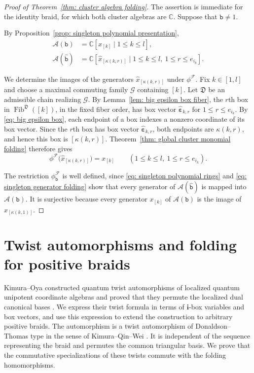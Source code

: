 \documentclass[12pt, leqno]{amsart}
\numberwithin{equation}{section}
\theoremstyle{plain}
\theoremstyle{definition}
\renewcommand{\le}{\leqslant}
\newcommand{\C}{\mathbb{C}}
\newcommand{\ve}{\boldsymbol{\varepsilon}}
\newcommand{\Fib}{\operatorname{Fib}}
\newcommand{\hx}{\widehat{x}}
\newcommand{\hve}{{\widehat{\ve}}}
\newcommand{\frakD}{\mathfrak{D}}
\newcommand{\bfi}{\mathbf{i}}
\newcommand{\calA}{\mathcal{A}}
\newcommand{\calF}{\mathcal{F}}
\newcommand{\calG}{\mathcal{G}}
\newcommand{\ttb}{\mathtt{b}}
\newcommand{\httb}{\widehat{\ttb}}
\begin{document}
\begin{proof}[Proof of Theorem~\ref{thm: cluster algebra folding}]
The assertion is immediate for the identity braid, for which both
cluster algebras are $\C$.  Suppose that $\ttb\ne1$.

By
Proposition~\ref{prop: singleton polynomial presentation},
\begin{equation} \label{eq: singleton polynomial rings}
\begin{aligned}
\calA(\ttb) &=\C[x_{[k]}\mid1\le k\le l], \\
\calA(\httb) &=\C[\hx_{[\kappa(k,r)]}\mid 1\le k\le l,\ 1\le r\le e_{i_k}].
\end{aligned}
\end{equation}

We determine the images of the generators $\hx_{[\kappa(k,r)]}$
under $\phi^\calF$.
Fix $k\in[1,l]$ and choose a maximal commuting family $\calG$ containing
$[k]$.
Let $\frakD$ be an admissible chain realizing $\calG$.
By Lemma~\ref{lem: big epsilon box fiber}, the $r$th box in
$\Fib^\frakD([k])$, in the fixed fiber order, has box vector
$\hve_{k,r}$ for $1\le r\le e_{i_k}$.
By \eqref{eq: big epsilon box}, each endpoint of a box indexes
a nonzero coordinate of its box vector.
Since the $r$th box has box vector $\hve_{k,r}$, both endpoints
are $\kappa(k,r)$, and hence this box is $[\kappa(k,r)]$.
Theorem~\ref{thm: global cluster monomial folding} therefore gives
\begin{equation}
\phi^\calF\bigl(\hx_{[\kappa(k,r)]}\bigr)=x_{[k]}
\qquad(1\le k\le l,\ 1\le r\le e_{i_k}).
\label{eq: singleton generator folding}
\end{equation}

The restriction $\phi^\calF_\ttb$ is well defined, since
\eqref{eq: singleton polynomial rings} and
\eqref{eq: singleton generator folding} show that every generator of
$\calA(\httb)$ is mapped into $\calA(\ttb)$.
It is surjective because every generator $x_{[k]}$ of $\calA(\ttb)$
is the image of $\hx_{[\kappa(k,1)]}$.
\end{proof}



\section{Twist automorphisms and folding for positive braids}
\label{sec: arbitrary positive word DT twists}

Kimura--Oya constructed quantum twist automorphisms of localized
quantum unipotent coordinate algebras and proved that they permute
the localized dual canonical bases
\cite[Theorem~6.1]{KimuraOya21}.
We express their twist formula in terms of $\bfi$-box variables
and box vectors, and use this expression to extend the construction
to arbitrary positive braids.
The automorphism is a twist automorphism of
Donaldson--Thomas type in the sense of Kimura--Qin--Wei
\cite{KimuraQinWei}.
It is independent of the sequence representing the braid and
permutes the common triangular basis.
We prove that the commutative specializations of these twists
commute with the folding homomorphisms.
\end{document}
